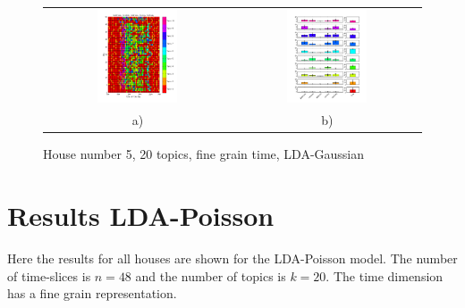 \begin{figure}[h!]
 \centering
 \begin{tabular}{c c}
  \includegraphics[width=0.45\textwidth]{Pictures/Gaus/fine/DayHN5TS48k20fine.png}
  &
  \includegraphics[width=0.45\textwidth]{Pictures/Gaus/fine/TopHN5TS48k20fine.png}\\
  a) & b)
 \end{tabular}
  \caption{House number 5, 20 topics, fine grain time, LDA-Gaussian}
\end{figure}

\chapter{Results LDA-Poisson}
\label{B}
Here the results for all houses are shown for the LDA-Poisson model. The number of time-slices is $n=48$ and the number of topics is $k=20$. The time dimension has a fine grain representation.


